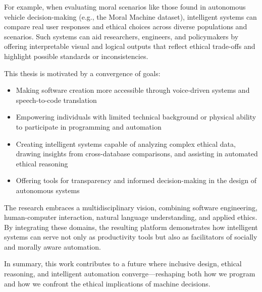 For example, when evaluating moral scenarios like those found in autonomous vehicle decision-making (e.g., the Moral Machine dataset), intelligent systems can compare real user responses and ethical choices across diverse populations and scenarios. Such systems can aid researchers, engineers, and policymakers by offering interpretable visual and logical outputs that reflect ethical trade-offs and highlight possible standards or inconsistencies.

This thesis is motivated by a convergence of goals:

\begin{itemize}
\item Making software creation more accessible through voice-driven systems and speech-to-code translation
\item Empowering individuals with limited technical background or physical ability to participate in programming and automation
\item Creating intelligent systems capable of analyzing complex ethical data, drawing insights from cross-database comparisons, and assisting in automated ethical reasoning
\item Offering tools for transparency and informed decision-making in the design of autonomous systems
\end{itemize}

The research embraces a multidisciplinary vision, combining software engineering, human-computer interaction, natural language understanding, and applied ethics. By integrating these domains, the resulting platform demonstrates how intelligent systems can serve not only as productivity tools but also as facilitators of socially and morally aware automation.

In summary, this work contributes to a future where inclusive design, ethical reasoning, and intelligent automation converge—reshaping both how we program and how we confront the ethical implications of machine decisions.
